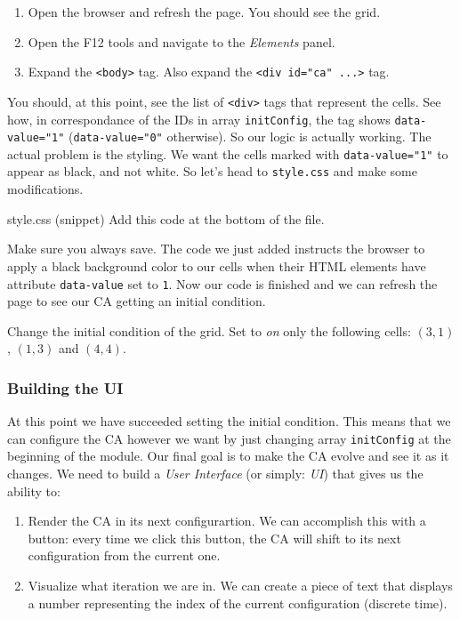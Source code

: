 \begin{enumerate}
\item Open the browser and refresh the page. You should see the grid.
\item Open the F12 tools and navigate to the \textit{Elements} panel.
\item Expand the \texttt{<body>} tag. Also expand the \texttt{<div id="ca" ...>} tag.
\end{enumerate}

You should, at this point, see the list of \texttt{<div>} tags that represent the cells. See how, in correspondance
of the IDs in array \texttt{initConfig}, the tag shows \texttt{data-value="1"} (\texttt{data-value="0"}
otherwise). So our logic is actually working. The actual problem is the styling. We want the cells marked with
\texttt{data-value="1"} to appear as black, and not white. So let's head to \texttt{style.css} and make some
modifications.

\begin{programcode}{style.css (snippet)}
Add this code at the bottom of the file.
\end{programcode}

Make sure you always save. The code we just added instructs the browser to apply a black background color
to our cells when their HTML elements have attribute \texttt{data-value} set to \texttt{1}.
Now our code is finished and we can refresh the page to see our CA getting an initial
condition.

\begin{problem}
\label{prob:changeinit}
Change the initial condition of the grid. Set to \textit{on} only the following
cells: $(3,1)$, $(1,3)$ and $(4,4)$.
\end{problem}

\subsubsection{Building the UI}
At this point we have succeeded setting the initial condition. This means that we can configure the CA however
we want by just changing array \texttt{initConfig} at the beginning of the module. Our final goal is to
make the CA evolve and see it as it changes. We need to build a \textit{User Interface} (or simply: \textit{UI})
that gives us the ability to:

\begin{enumerate}
\item Render the CA in its next configurartion. We can accomplish this with a button: every time we
click this button, the CA will shift to its next configuration from the current one.
\item Visualize what iteration we are in. We can create a piece of text that displays a number
representing the index of the current configuration (discrete time).
\end{enumerate}

